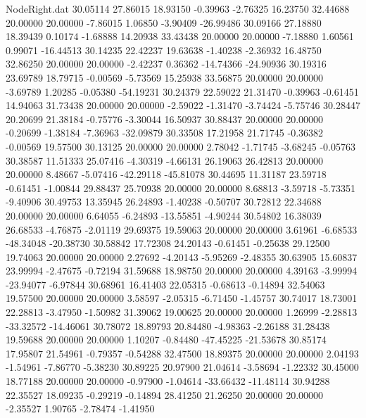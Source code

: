 \begin{filecontents}{NodeRight.dat}
  30.05114   27.86015   18.93150    -0.39963   -2.76325   16.23750   32.44688   20.00000   20.00000   -7.86015    1.06850   -3.90409  -26.99486
  30.09166   27.18880   18.39439     0.10174   -1.68888   14.20938   33.43438   20.00000   20.00000   -7.18880    1.60561    0.99071  -16.44513
  30.14235   22.42237   19.63638    -1.40238   -2.36932   16.48750   32.86250   20.00000   20.00000   -2.42237    0.36362  -14.74366  -24.90936
  30.19316   23.69789   18.79715    -0.00569   -5.73569   15.25938   33.56875   20.00000   20.00000   -3.69789    1.20285   -0.05380  -54.19231
  30.24379   22.59022   21.31470    -0.39963   -0.61451   14.94063   31.73438   20.00000   20.00000   -2.59022   -1.31470   -3.74424   -5.75746
  30.28447   20.20699   21.38184    -0.75776   -3.30044   16.50937   30.88437   20.00000   20.00000   -0.20699   -1.38184   -7.36963  -32.09879
  30.33508   17.21958   21.71745    -0.36382   -0.00569   19.57500   30.13125   20.00000   20.00000    2.78042   -1.71745   -3.68245   -0.05763
  30.38587   11.51333   25.07416    -4.30319   -4.66131   26.19063   26.42813   20.00000   20.00000    8.48667   -5.07416  -42.29118  -45.81078
  30.44695   11.31187   23.59718    -0.61451   -1.00844   29.88437   25.70938   20.00000   20.00000    8.68813   -3.59718   -5.73351   -9.40906
  30.49753   13.35945   26.24893    -1.40238   -0.50707   30.72812   22.34688   20.00000   20.00000    6.64055   -6.24893  -13.55851   -4.90244
  30.54802   16.38039   26.68533    -4.76875   -2.01119   29.69375   19.59063   20.00000   20.00000    3.61961   -6.68533  -48.34048  -20.38730
  30.58842   17.72308   24.20143    -0.61451   -0.25638   29.12500   19.74063   20.00000   20.00000    2.27692   -4.20143   -5.95269   -2.48355
  30.63905   15.60837   23.99994    -2.47675   -0.72194   31.59688   18.98750   20.00000   20.00000    4.39163   -3.99994  -23.94077   -6.97844
  30.68961   16.41403   22.05315    -0.68613   -0.14894   32.54063   19.57500   20.00000   20.00000    3.58597   -2.05315   -6.71450   -1.45757
  30.74017   18.73001   22.28813    -3.47950   -1.50982   31.39062   19.00625   20.00000   20.00000    1.26999   -2.28813  -33.32572  -14.46061
  30.78072   18.89793   20.84480    -4.98363   -2.26188   31.28438   19.59688   20.00000   20.00000    1.10207   -0.84480  -47.45225  -21.53678
  30.85174   17.95807   21.54961    -0.79357   -0.54288   32.47500   18.89375   20.00000   20.00000    2.04193   -1.54961   -7.86770   -5.38230
  30.89225   20.97900   21.04614    -3.58694   -1.22332   30.45000   18.77188   20.00000   20.00000   -0.97900   -1.04614  -33.66432  -11.48114
  30.94288   22.35527   18.09235    -0.29219   -0.14894   28.41250   21.26250   20.00000   20.00000   -2.35527    1.90765   -2.78474   -1.41950

\end{filecontents}
